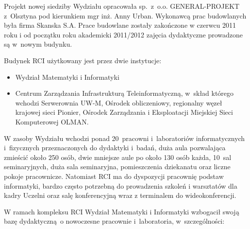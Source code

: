 \documentclass[a4paper,11pt]{article}
\begin{document}
\begin{itemize}
Projekt nowej siedziby Wydziału opracowała sp.~z~o.o. GENERAL-PROJEKT z~Olsztyna pod kierunkiem mgr
inż. Anny Urban. Wykonawcą prac budowlanych była firma Skanska S.A. Prace budowlane zostały
zakończone w czerwcu 2011 roku i od początku roku akademicki 2011/2012 zajęcia dydaktyczne prowadzone
są w~nowym budynku.

Budynek RCI użytkowany jest przez dwie instytucje:
\begin{itemize}
\item Wydział Matematyki i Informatyki
\item Centrum Zarządzania Infrastrukturą Teleinformatyczną, w~skład którego wchodzi Serwerownia UW-M,
Ośrodek obliczeniowy, regionalny węzeł krajowej sieci Pionier, Ośrodek Zarządzania i Eksploatacji
Miejskiej Sieci Komputerowej OLMAN.
\end{itemize}

W zasoby Wydziału wchodzi ponad 20~pracowni i~laboratoriów informatycznych i~fizycznych przeznaczonych
do dydaktyki i~badań, duża aula pozwalająca zmieścić około 250 osób, dwie mniejsze aule po około 130 osób
każda, 10~sal seminaryjnych, duża sala seminaryjna, pomieszczenia dziekanatu oraz liczne pokoje pracownicze.
Natomiast RCI ma do dyspozycji pracownię podstaw informatyki, bardzo często potrzebną do prowadzenia
szkoleń i warsztatów dla kadry Uczelni oraz salę konferencyjną wraz z terminalem do wideokonferencji.

W ramach kompleksu RCI Wydział Matematyki i Informatyki wzbogacił swoją bazę dydaktyczną~o
nowoczesne pracownie i~laboratoria, w~szczególności:


\end{itemize}
\end{document}
